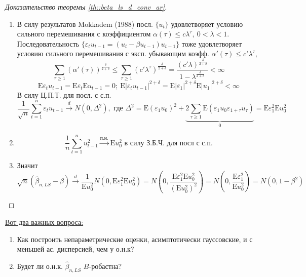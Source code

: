 \documentclass[12pt]{article}
\def\eps{ \varepsilon }
\def\E{ \mathrm{E} }
\begin{document}
\begin{proof}[Доказательство теоремы \ref{th::beta_ls_d_conv_ar}]
\begin{enumerate}
        \item В силу результатов Mokkadem (1988) посл. $\{u_t\}$ удовлетворяет условию сильного перемешивания с коэффициентом $\alpha(\tau)\leq c\lambda^\tau,\ 0<\lambda<1$.
        Последовательность $\{\eps_t u_{t-1}=(u_t-\beta u_{t-1})u_{t-1}\}$ тоже удовлетворяет условию сильного перемешивания с эксп. убывающим коэфф. 
        $\alpha'(\tau)\leq c'\lambda^\tau$,
        \[\sum_{\tau\geq1}(\alpha'(\tau))^{\frac{\delta}{2+\delta}}\leq\sum_{\tau\geq1}(c'\lambda^\tau)^{\frac{\delta}{2+\delta}}=\frac{(c'\lambda)^{\frac{\delta}{2+\delta}}}{1-\lambda^{\frac{\delta}{2+\delta}}}<\infty\]
        \[\E\eps_t u_{t-1}=\E\eps_t\E u_{t-1}=0;\ \E\left\lvert \eps_t u_{t-1}\right\rvert ^{2+\delta}=\E\left\lvert \eps_1\right\rvert ^{2+\delta}\E\left\lvert u_1\right\rvert ^{2+\delta}<\infty\]
        В силу Ц.П.Т. для посл. с с.п.
        \[\frac{1}{\sqrt{n}}\sum_{t=1}^n\eps_t u_{t-1}\xrightarrow{d}N(0,\Delta^2),\text{ где }\Delta^2=\E(\eps_1 u_0)^2+\underbrace{2\sum_{\tau\geq1}\E(\eps_1 u_0\eps_{1+\tau}u_{\tau})}_{0}=\E\eps_1^2\E u_0^2\]
        
        \item
        \[\frac{1}{n}\sum_{t=1}^nu_{t-1}^2\xrightarrow{\text{п.н.}}\E u_0^2\text{ в силу З.Б.Ч. для посл с с.п.}\]

        \item Значит
        \[\sqrt{n}(\widehat{\beta}_{n,LS}-\beta)\xrightarrow{d}\frac{1}{\E u_0^2}N(0,\E\eps_1^2\E u_0^2)=N\left(0,\frac{\E\eps_1^2\E u_0^2}{(\E u_0^2)^2}\right)=N\left(0,\frac{\E\eps_1^2}{\E u_0^2}\right)=N(0,1-\beta^2)\]
    \end{enumerate}
\end{proof}

\underline{Вот два важных вопроса:}
\begin{enumerate}
    \item Как построить непараметрические оценки, асимптотически гауссовские, и с меньшей ас. дисперсией, чем у о.н.к?
    \item Будет ли о.н.к. $\widehat{\beta}_{n,LS}$ $B$-робастна?
\end{enumerate}
\end{document}
